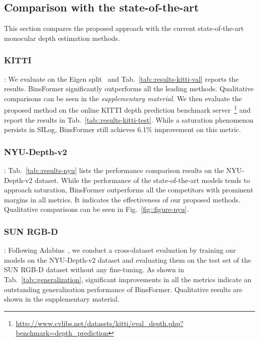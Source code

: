 \documentclass[runningheads]{llncs}
\begin{document}
\subsection{Comparison with the state-of-the-art}
This section compares the proposed approach with the current state-of-the-art monocular depth estimation methods.

\subsubsection{KITTI}: We evaluate on the Eigen split~\cite{eigen2014depth} and Tab.~\ref{tab::results-kitti-val} reports the results. BinsFormer significantly outperforms all the leading methods. Qualitative comparisons can be seen in the \textit{supplementary material}. We then evaluate the proposed method on the online KITTI depth prediction benchmark server~\footnote{\url{http://www.cvlibs.net/datasets/kitti/eval\_depth.php?benchmark=depth\_prediction}} and report the results in Tab.~\ref{tab::results-kitti-test}. While a saturation phenomenon persists in SILog, BinsFormer still achieves 6.1\% improvement on this metric.

\subsubsection{NYU-Depth-v2}: Tab.~\ref{tab::results-nyu} lists the performance comparison results on the NYU-Depth-v2 dataset. While the performance of the state-of-the-art models tends to approach saturation, BinsFormer outperforms all the competitors with prominent margins in all metrics. It indicates the effectiveness of our proposed methods. Qualitative comparisons can be seen in Fig.~\ref{fig::figure-nyu}.

\subsubsection{SUN RGB-D}: Following Adabins~\cite{bhat2021adabins}, we conduct a cross-dataset evaluation by training our models on the NYU-Depth-v2 dataset and evaluating them on the test set of the SUN RGB-D dataset without any fine-tuning. As shown in Tab.~\ref{tab::generalization}, significant improvements in all the metrics indicate an outstanding generalization performance of BinsFormer. Qualitative results are shown in the supplementary material.
\end{document}
